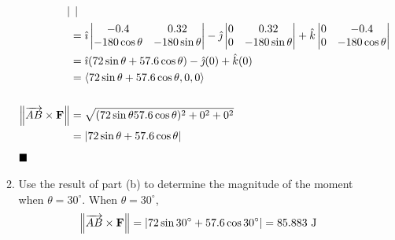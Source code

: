 \begin{enumerate}
\begin{enumerate}[label={(\alph{*})}]
\begin{align*}
\begin{vmatrix}
                                                                          \end{vmatrix}                   \\
                                                                      & = \hat{\imath} \begin{vmatrix}
                                                                                           -0.4           & 0.32           \\
                                                                                           -180\cos\theta & -180\sin\theta
                                                                                       \end{vmatrix} - \hat{\jmath} \begin{vmatrix}
                                                                                                                        0 & 0.32           \\
                                                                                                                        0 & -180\sin\theta
                                                                                                                    \end{vmatrix} + \hat{k} \begin{vmatrix}
                                                                                                                                                0 & -0.4           \\
                                                                                                                                                0 & -180\cos\theta
                                                                                                                                            \end{vmatrix} \\
                                                                      & = \hat{\imath}(72\sin\theta + 57.6\cos\theta) - \hat{\jmath}(0) + \hat{k}(0)           \\
                                                                      & = \langle 72\sin\theta + 57.6\cos\theta, 0, 0 \rangle                                  \\
                        \\
                        \left\lVert\overrightarrow{A B} \times \mathbf{F}\right\rVert & = \sqrt{(72\sin\theta  57.6\cos\theta)^2 + 0^2 + 0^2}                                  \\
                                                                      & = |72\sin\theta + 57.6\cos\theta|
                    \end{align*}
                    $\hfill\blacksquare$
              \item Use the result of part (b) to determine the magnitude of the moment when
                    $\theta=30^{\circ}$. \sol{} When $\theta=30^{\circ}$, \[\left\lVert\overrightarrow{A B} \times \mathbf{F}\right\rVert = |72\sin30^{\circ} + 57.6\cos30^{\circ}| = 85.883 \text{ J}\]


\end{enumerate}
\end{enumerate}
